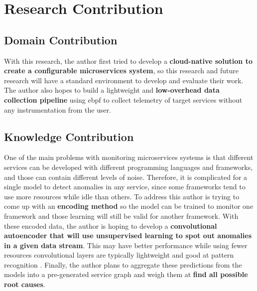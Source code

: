 \section{Research Contribution}


\subsection{Domain Contribution}

With this research, the author first tried to develop a \textbf{cloud-native solution to create a configurable microservices system}, so this research and future research will have a standard environment to develop and evaluate their work. The author also hopes to build a lightweight and \textbf{low-overhead data collection pipeline} using \ac{ebpf} to collect telemetry of target services without any instrumentation from the user.

\subsection{Knowledge Contribution}

One of the main problems with monitoring microservices systems is that different services can be developed with different programming languages and frameworks, and those can contain different levels of noise\label{need-for-encoding}. Therefore, it is complicated for a single model to detect anomalies in any service, since some frameworks tend to use more resources while idle than others. To address this author is trying to come up with an \textbf{encoding method} so the model can be trained to monitor one framework and those learning will still be valid for another framework. With these encoded data, the author is hoping to develop a \textbf{convolutional autoencoder that will use unsupervised learning to spot out anomalies in a given data stream}. This may have better performance while using fewer resources convolutional layers are typically lightweight and good at pattern recognition \citep{oord2016wavenet}. Finally, the author plans to aggregate these predictions from the models into a pre-generated service graph and weigh them at \textbf{find all possible root causes}.
